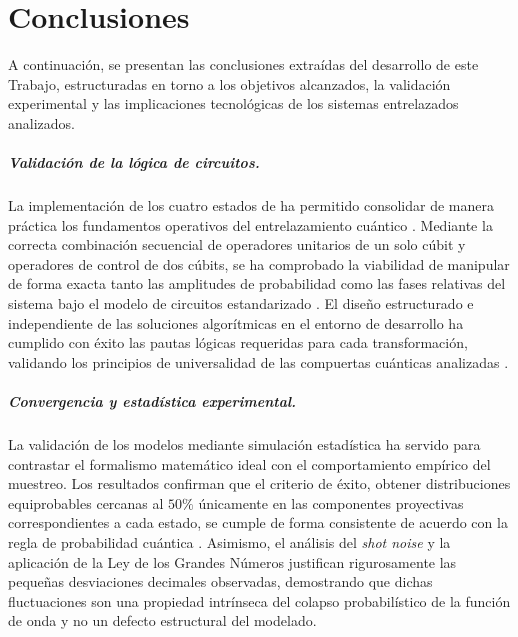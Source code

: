 \documentclass[11pt,a4paper,spanish]{book}
\begin{document}
\chapter{Conclusiones}

A continuación, se presentan las conclusiones extraídas del desarrollo de este Trabajo, estructuradas en torno a los objetivos alcanzados, la validación experimental y las implicaciones tecnológicas de los sistemas entrelazados analizados.

\paragraph{Validación de la lógica de circuitos.} La implementación de los cuatro estados de \cite{bell1964} ha permitido consolidar de manera práctica los fundamentos operativos del entrelazamiento cuántico \citep{schrodinger1935}. Mediante la correcta combinación secuencial de operadores unitarios de un solo cúbit y operadores de control de dos cúbits, se ha comprobado la viabilidad de manipular de forma exacta tanto las amplitudes de probabilidad como las fases relativas del sistema bajo el modelo de circuitos estandarizado \citep{deutsch1989}. El diseño estructurado e independiente de las soluciones algorítmicas en el entorno de desarrollo ha cumplido con éxito las pautas lógicas requeridas para cada transformación, validando los principios de universalidad de las compuertas cuánticas analizadas \citep{barenco1995}.

\paragraph{Convergencia y estadística experimental.} La validación de los modelos mediante simulación estadística ha servido para contrastar el formalismo matemático ideal con el comportamiento empírico del muestreo. Los resultados confirman que el criterio de éxito, obtener distribuciones equiprobables cercanas al $50\%$ únicamente en las componentes proyectivas correspondientes a cada estado, se cumple de forma consistente de acuerdo con la regla de probabilidad cuántica \citep{born1926}. Asimismo, el análisis del \emph{shot noise} \citep{schottky1918} y la aplicación de la Ley de los Grandes Números justifican rigurosamente las pequeñas desviaciones decimales observadas, demostrando que dichas fluctuaciones son una propiedad intrínseca del colapso probabilístico de la función de onda \citep{nielsen2010} y no un defecto estructural del modelado.
\end{document}
